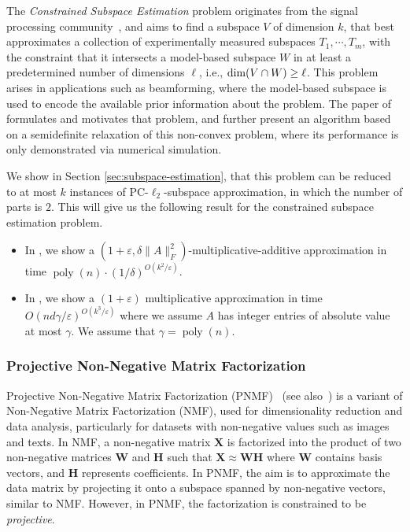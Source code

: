 \documentclass[11pt]{article}
\theoremstyle{plain}
\theoremstyle{plain}
\theoremstyle{definition}
\theoremstyle{plain}
\theoremstyle{remark}
\newcommand{\eps}{\varepsilon}
\newcommand{\poly}{\operatorname{poly}}
\DeclareRobustCommand{\fairSAp}[1]{PC-$\ell_{#1}$-subspace approximation}
\begin{document}
The {\em Constrained Subspace Estimation} problem originates from the signal processing community~\cite{santamaria2017constrained}, and aims to find a subspace $V$ of dimension $k$, that best approximates a collection of experimentally measured subspaces $T_1,\cdots,T_m$, 
with the constraint that it intersects a model-based subspace $W$ in at least a predetermined number of dimensions $\ell$, i.e., $\textnormal{dim}(V \cap W)\geq \ell$. This problem arises in applications such as beamforming, where the model-based subspace is used to encode the available prior information about the problem. The paper of \cite{santamaria2017constrained} formulates and motivates that problem, and further present an algorithm based on a semidefinite relaxation of this non-convex
problem, where its performance is only
demonstrated via numerical simulation.

We show in Section \ref{sec:subspace-estimation}, that this problem can be reduced to at most $k$ instances of \fairSAp{2}, in which the number of parts is $2$. This will give us the following result for the constrained subspace estimation problem.
\begin{itemize}
    \item In , we show a $(1+\eps, \delta\|A\|_F^2)$-multiplicative-additive approximation in time $\poly(n)\cdot (1/\delta)^{O(k^2/\varepsilon)}$.  
    \item In , we show a $(1+\varepsilon)$ multiplicative approximation in time $O(nd\gamma/\varepsilon)^{O(k^3/\varepsilon)}$ where we assume $A$ has integer entries of absolute value at most $\gamma$. We assume that $\gamma=\poly(n)$. 
\end{itemize}


\subsubsection{Projective Non-Negative Matrix Factorization}

Projective Non-Negative Matrix Factorization (PNMF)~\cite{yuan2005projective} (see also~\cite{Yuan2009ProjectiveNM, Yang2010LinearAN}) is a variant of Non-Negative Matrix Factorization (NMF), used for dimensionality reduction and data analysis, particularly for datasets with non-negative values such as images and texts. In NMF, a non-negative matrix $\bm{X}$ is factorized into the product of two non-negative matrices $\bm{W}$ and $\bm{H}$ such that $\bm{X} \approx \bm{WH}$ where $\bm{W}$ contains basis vectors, and $\bm{H}$ represents coefficients. 
In PNMF, the aim is to approximate the data matrix by projecting it onto a subspace spanned by non-negative vectors, similar to NMF. However, in PNMF, the factorization is constrained to be {\em projective}.
\end{document}
